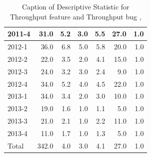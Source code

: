 \documentclass[UKenglish]{ifimaster}  %
\begin{document}
\begin{table}[!htbp]
\begin{adjustwidth}{-2.5cm}{}
{{\begin{tabular}{ | l | r | r | r | r | r | r | }
2011-4 & 31.0 & 5.2 & 3.0 & 5.5 & 27.0 & 1.0\\ \hline
2012-1 & 36.0 & 6.8 & 5.0 & 5.8 & 20.0 & 1.0\\ \hline
2012-2 & 22.0 & 3.5 & 2.0 & 4.1 & 15.0 & 1.0\\ \hline
2012-3 & 24.0 & 3.2 & 3.0 & 2.4 & 9.0 & 1.0\\ \hline
2012-4 & 34.0 & 5.2 & 4.0 & 4.5 & 22.0 & 1.0\\ \hline
2013-1 & 34.0 & 3.4 & 2.0 & 3.0 & 10.0 & 1.0\\ \hline
2013-2 & 19.0 & 1.6 & 1.0 & 1.1 & 5.0 & 1.0\\ \hline
2013-3 & 21.0 & 2.1 & 1.0 & 2.2 & 11.0 & 1.0\\ \hline
2013-4 & 11.0 & 1.7 & 1.0 & 1.3 & 5.0 & 1.0\\ \hline
Total & 342.0 & 4.0 & 3.0 & 4.1 & 27.0 & 1.0\\ \hline
\end{tabular}
}
}
\end{adjustwidth}
\caption[Optional caption for list of figures]{Caption of Descriptive Statistic for Throughput feature and Throughput bug  , }
\label{DS:3:2}
\end{table}
\end{document}
